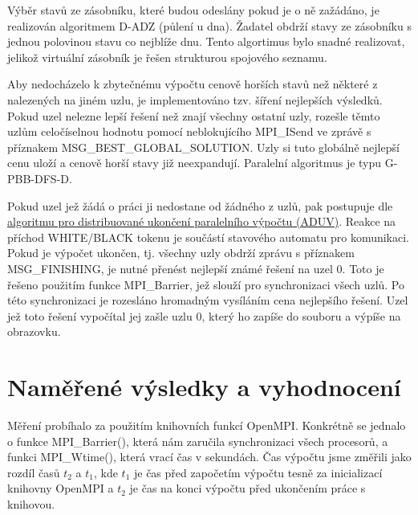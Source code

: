 \documentclass[12pt]{article}
\begin{document}
Výběr stavů ze zásobníku, které budou odeslány pokud je o ně zažádáno, je realizován algoritmem D-ADZ (půlení u dna). Žadatel obdrží stavy ze zásobníku s jednou polovinou stavu co nejblíže dnu. Tento algortimus bylo snadné realizovat, jelikož virtuální zásobník je řešen strukturou spojového seznamu.

Aby nedocházelo k zbytečnému výpočtu cenově horších stavů než některé z nalezených na jiném uzlu, je implementováno tzv. šíření nejlepších výsledků. Pokud uzel nelezne lepší řešení než znají všechny ostatní uzly, rozešle těmto uzlům celočíselnou hodnotu pomocí neblokujícího MPI\_ISend ve zprávě s příznakem MSG\_BEST\_GLOBAL\_SOLUTION. Uzly si tuto globálně nejlepší cenu uloží a cenově horší stavy již neexpandují. Paralelní algoritmus je typu G-PBB-DFS-D.

Pokud uzel jež žádá o práci ji nedostane od žádného z uzlů, pak postupuje dle \href{https://edux.fit.cvut.cz/courses/MI-PAR/labs/prohledavani_do_hloubky#algoritmus_pro_distribuovane_ukonceni_paralelniho_vypoctu_aduv}{algoritmu pro distribuované ukončení paralelního výpočtu (ADUV)}. Reakce na příchod WHITE/BLACK tokenu je součástí stavového automatu pro komunikaci. Pokud je výpočet ukončen, tj. všechny uzly obdrží zprávu s příznakem MSG\_FINISHING, je nutné přenést nejlepší známé řešení na uzel 0. Toto je řešeno použitím funkce MPI\_Barrier, jež slouží pro synchronizaci všech uzlů. Po této synchronizaci je rozesláno hromadným vysíláním cena nejlepšího řešení. Uzel jež toto řešení vypočítal jej zašle uzlu 0, který ho zapíše do souboru a výpíše na obrazovku. 

\section{Naměřené výsledky a vyhodnocení}
Měření probíhalo za použitím knihovních funkcí OpenMPI. Konkrétně se jednalo o funkce MPI\_Barrier(), 
která nám zaručila synchronizaci všech procesorů, a funkci MPI\_Wtime(), která vrací čas v sekundách.
Čas výpočtu jsme změřili jako rozdíl časů \(t_2\) a \(t_1\), kde \(t_1\) je čas před započetím výpočtu
tesně za inicializací knihovny OpenMPI a \(t_2\) je čas na konci výpočtu před ukončením práce s knihovou.
\end{document}
